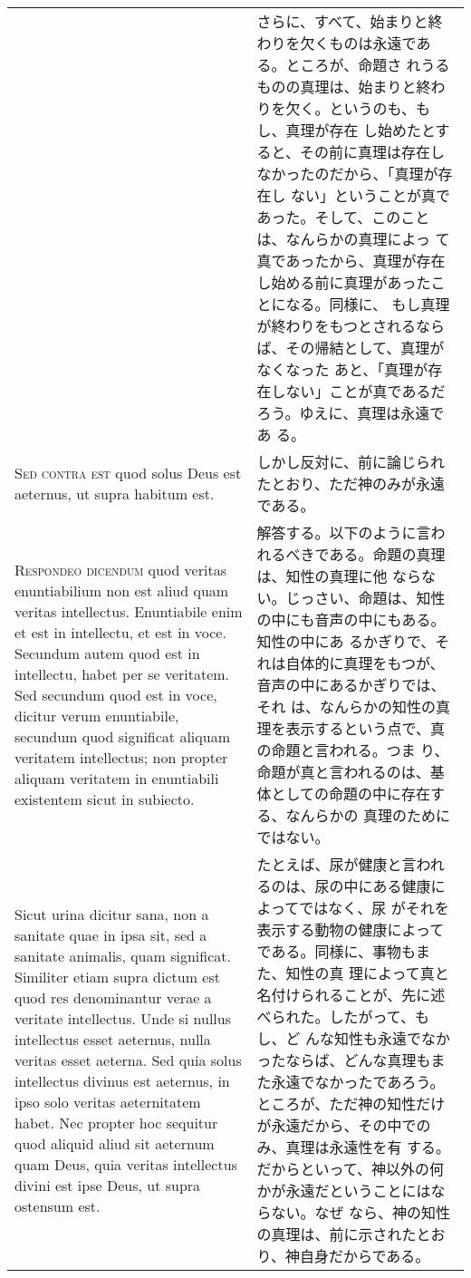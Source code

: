 \documentclass[10pt]{jsarticle} %
\begin{document}
\begin{longtable}{p{21em}p{21em}}
&

さらに、すべて、始まりと終わりを欠くものは永遠である。ところが、命題さ
れうるものの真理は、始まりと終わりを欠く。というのも、もし、真理が存在
し始めたとすると、その前に真理は存在しなかったのだから、「真理が存在し
ない」ということが真であった。そして、このことは、なんらかの真理によっ
て真であったから、真理が存在し始める前に真理があったことになる。同様に、
もし真理が終わりをもつとされるならば、その帰結として、真理がなくなった
あと、「真理が存在しない」ことが真であるだろう。ゆえに、真理は永遠であ
る。

\\

{\scshape Sed contra est} quod solus Deus est aeternus, ut supra
 habitum est.

&

しかし反対に、前に論じられたとおり、ただ神のみが永遠である。

\\

{\scshape Respondeo dicendum} quod veritas enuntiabilium non est aliud
quam veritas intellectus. Enuntiabile enim et est in intellectu, et
est in voce. Secundum autem quod est in intellectu, habet per se
veritatem. Sed secundum quod est in voce, dicitur verum enuntiabile,
secundum quod significat aliquam veritatem intellectus; non propter
aliquam veritatem in enuntiabili existentem sicut in subiecto.


&

解答する。以下のように言われるべきである。命題の真理は、知性の真理に他
ならない。じっさい、命題は、知性の中にも音声の中にもある。知性の中にあ
るかぎりで、それは自体的に真理をもつが、音声の中にあるかぎりでは、それ
は、なんらかの知性の真理を表示するという点で、真の命題と言われる。つま
り、命題が真と言われるのは、基体としての命題の中に存在する、なんらかの
真理のためにではない。

\\

Sicut urina dicitur sana, non a sanitate quae in ipsa sit, sed a
sanitate animalis, quam significat. Similiter etiam supra dictum est
quod res denominantur verae a veritate intellectus. Unde si nullus
intellectus esset aeternus, nulla veritas esset aeterna. Sed quia
solus intellectus divinus est aeternus, in ipso solo veritas
aeternitatem habet. Nec propter hoc sequitur quod aliquid aliud sit
aeternum quam Deus, quia veritas intellectus divini est ipse Deus, ut
supra ostensum est.

&

たとえば、尿が健康と言われるのは、尿の中にある健康によってではなく、尿
がそれを表示する動物の健康によってである。同様に、事物もまた、知性の真
理によって真と名付けられることが、先に述べられた。したがって、もし、ど
んな知性も永遠でなかったならば、どんな真理もまた永遠でなかったであろう。
ところが、ただ神の知性だけが永遠だから、その中でのみ、真理は永遠性を有
する。だからといって、神以外の何かが永遠だということにはならない。なぜ
なら、神の知性の真理は、前に示されたとおり、神自身だからである。


\end{longtable}
\end{document}
